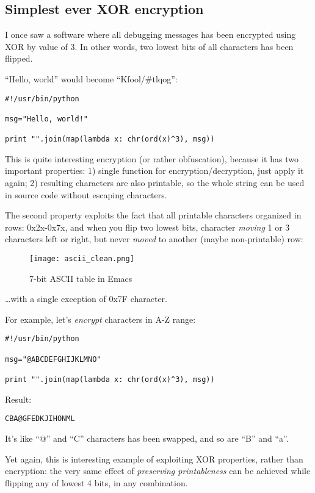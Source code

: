 \subsection{Simplest ever XOR encryption}

I once saw a software where all debugging messages has been encrypted using XOR by value of 3.
In other words, two lowest bits of all characters has been flipped.

``Hello, world'' would become ``Kfool/\#tlqog'':

\begin{lstlisting}
#!/usr/bin/python

msg="Hello, world!"

print "".join(map(lambda x: chr(ord(x)^3), msg))
\end{lstlisting}

This is quite interesting encryption (or rather obfuscation), because it has two important properties:
1) single function for encryption/decryption, just apply it again;
2) resulting characters are also printable, so the whole string can be used in source code without escaping characters.

The second property exploits the fact that all printable characters organized in rows: 0x2x-0x7x, and when you 
flip two lowest bits, character \emph{moving} 1 or 3 characters left or right, but never \emph{moved} to another (maybe
non-printable) row:

\begin{figure}[H]
\centering
\texttt{[image: ascii\_clean.png]}
\caption{7-bit \ac{ASCII} table in Emacs}
\end{figure}

\dots with a single exception of 0x7F character.

For example, let's \emph{encrypt} characters in A-Z range:

\begin{lstlisting}
#!/usr/bin/python

msg="@ABCDEFGHIJKLMNO"

print "".join(map(lambda x: chr(ord(x)^3), msg))
\end{lstlisting}

Result:
\begin{lstlisting}
CBA@GFEDKJIHONML
\end{lstlisting}

It's like ``@'' and ``C'' characters has been swapped, and so are ``B'' and ``a''.

Yet again, this is interesting example of exploiting XOR properties, rather than encryption:
the very same effect of \emph{preserving printableness} can be achieved while flipping any of lowest 4 bits,
in any combination.


